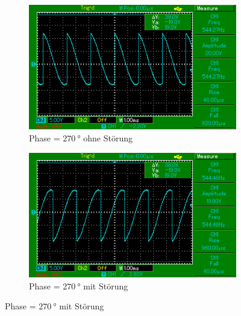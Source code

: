 \begin{figure}[H]
\begin{subfigure}{0.495\linewidth}
        \includegraphics[width=\textwidth]{images/aufg2_phi270.jpg}
        \caption{Phase = $\SI{270}{\degree}$ ohne Störung}
        \label{fig:3i}
    \end{subfigure}
    \begin{subfigure}{0.495\linewidth}
        \centering
        \includegraphics[width=\textwidth]{images/aufg3_phi270.jpg}
        \caption{Phase = $\SI{270}{\degree}$ mit Störung}
        \label{fig:3j}
    \end{subfigure}
\end{figure}

\begin{table}[H]
    \centering
    
    \caption{Messwerte ohne Störung}
    \label{tab:1}
\end{table}

\begin{table}[H]
    \centering
    
    \caption{Messwerte mit Störung}
    \label{tab:2}
\end{table}

